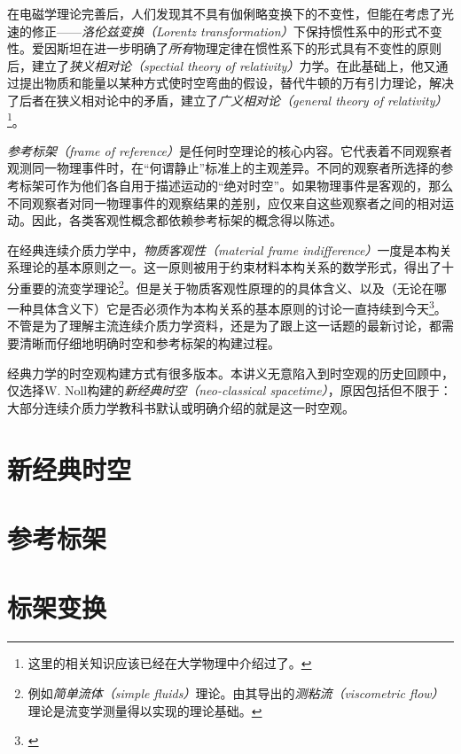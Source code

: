 \documentclass[zihao=-4,linespread=1.5,a4paper,heading=true,twoside]{ctexbook}
\theoremstyle{definition}
\theoremstyle{plain}
\begin{document}
在电磁学理论完善后，人们发现其不具有伽俐略变换下的不变性，但能在考虑了光速的修正——\emph{洛伦兹变换（Lorentz transformation）}下保持惯性系中的形式不变性。爱因斯坦在进一步明确了\emph{所有}物理定律在惯性系下的形式具有不变性的原则后，建立了\emph{狭义相对论（spectial theory of relativity）}力学。在此基础上，他又通过提出物质和能量以某种方式使时空弯曲的假设，替代牛顿的万有引力理论，解决了后者在狭义相对论中的矛盾，建立了\emph{广义相对论（general theory of  relativity）}\footnote{这里的相关知识应该已经在大学物理中介绍过了\cite[\S 1,\S 2.5]{邓文基2009大物上}\cite[\S 24]{邓文基2009大物下}。}。

\emph{参考标架（frame of reference）}是任何时空理论的核心内容。它代表着不同观察者观测同一物理事件时，在“何谓静止”标准上的主观差异。不同的观察者所选择的参考标架可作为他们各自用于描述运动的“绝对时空”。如果物理事件是客观的，那么不同观察者对同一物理事件的观察结果的差别，应仅来自这些观察者之间的相对运动。因此，各类客观性概念都依赖参考标架的概念得以陈述。

在经典连续介质力学中，\emph{物质客观性（material frame indifference）}一度是本构关系理论的基本原则之一\cite[Sect.293]{Truesdell1960}\cite[Sect.19]{Truesdell2004}。这一原则被用于约束材料本构关系的数学形式，得出了十分重要的流变学理论\footnote{例如\emph{简单流体（simple fluids）}理论\cite{Noll1958}。由其导出的\emph{测粘流（viscometric flow）}理论是流变学测量得以实现的理论基础\cite{Coleman1966}\cite{Walters1975}。}。但是关于物质客观性原理的的具体含义、以及（无论在哪一种具体含义下）它是否必须作为本构关系的基本原则的讨论一直持续到今天\footnote{\cite{Gennes1983}\cite{Frewer2009}}。不管是为了理解主流连续介质力学资料，还是为了跟上这一话题的最新讨论，都需要清晰而仔细地明确时空和参考标架的构建过程。

经典力学的时空观构建方式有很多版本\cite{Weatherall2022}。本讲义无意陷入到时空观的历史回顾中，仅选择W. Noll\cite{Noll1973}构建的\emph{新经典时空（neo-classical spacetime）}，原因包括但不限于：大部分连续介质力学教科书默认或明确介绍的就是这一时空观。
\section{新经典时空}\label{sec:III.5.1}

\section{参考标架}\label{sec:III.5.2}

\section{标架变换}\label{sec:III.5.3}

\end{document}
